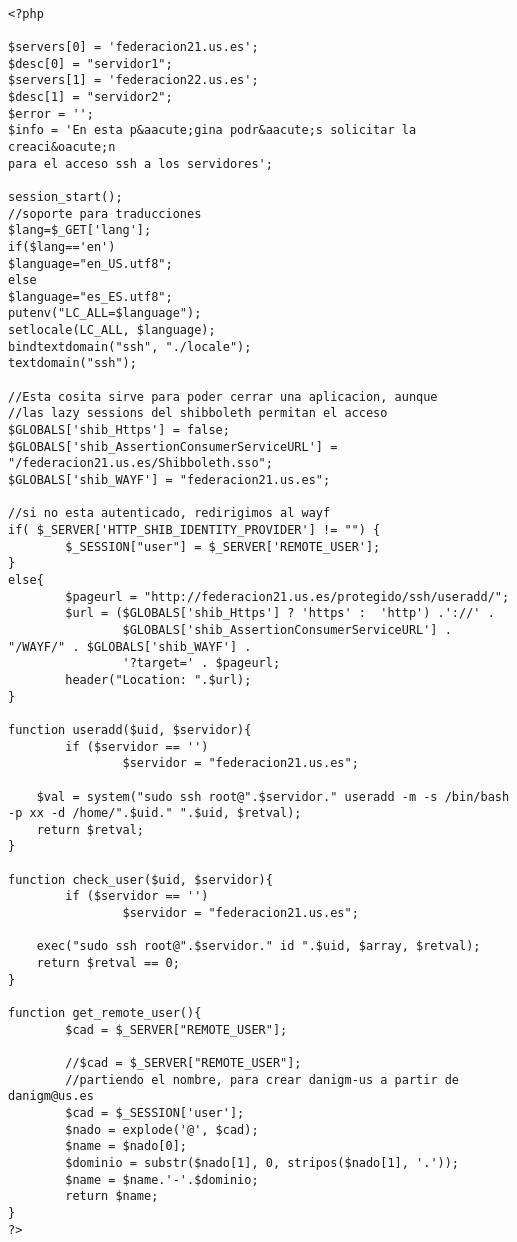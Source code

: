     \begin{lstlisting}

<?php 

$servers[0] = 'federacion21.us.es';
$desc[0] = "servidor1";
$servers[1] = 'federacion22.us.es';
$desc[1] = "servidor2";
$error = '';
$info = 'En esta p&aacute;gina podr&aacute;s solicitar la creaci&oacute;n
para el acceso ssh a los servidores';

session_start();
//soporte para traducciones
$lang=$_GET['lang'];
if($lang=='en')
$language="en_US.utf8";
else
$language="es_ES.utf8";
putenv("LC_ALL=$language");
setlocale(LC_ALL, $language);
bindtextdomain("ssh", "./locale");
textdomain("ssh");

//Esta cosita sirve para poder cerrar una aplicacion, aunque
//las lazy sessions del shibboleth permitan el acceso
$GLOBALS['shib_Https'] = false;
$GLOBALS['shib_AssertionConsumerServiceURL'] = "/federacion21.us.es/Shibboleth.sso";
$GLOBALS['shib_WAYF'] = "federacion21.us.es";

//si no esta autenticado, redirigimos al wayf
if( $_SERVER['HTTP_SHIB_IDENTITY_PROVIDER'] != "") {
        $_SESSION["user"] = $_SERVER['REMOTE_USER'];
}
else{
        $pageurl = "http://federacion21.us.es/protegido/ssh/useradd/";
        $url = ($GLOBALS['shib_Https'] ? 'https' :  'http') .'://' .
                $GLOBALS['shib_AssertionConsumerServiceURL'] . "/WAYF/" . $GLOBALS['shib_WAYF'] .
                '?target=' . $pageurl;
        header("Location: ".$url);
}

function useradd($uid, $servidor){
        if ($servidor == '')
                $servidor = "federacion21.us.es";

    $val = system("sudo ssh root@".$servidor." useradd -m -s /bin/bash -p xx -d /home/".$uid." ".$uid, $retval);
    return $retval;
}

function check_user($uid, $servidor){
        if ($servidor == '')
                $servidor = "federacion21.us.es";

    exec("sudo ssh root@".$servidor." id ".$uid, $array, $retval);
    return $retval == 0;
}

function get_remote_user(){
        $cad = $_SERVER["REMOTE_USER"];

        //$cad = $_SERVER["REMOTE_USER"];
        //partiendo el nombre, para crear danigm-us a partir de danigm@us.es
        $cad = $_SESSION['user'];
        $nado = explode('@', $cad);
        $name = $nado[0];
        $dominio = substr($nado[1], 0, stripos($nado[1], '.'));
        $name = $name.'-'.$dominio;
        return $name;
}
?>


\end{lstlisting}
